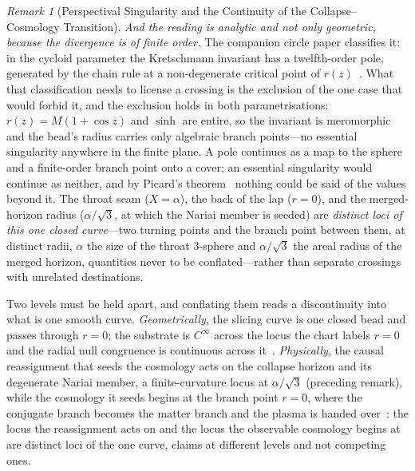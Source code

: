 \documentclass[11pt,a4paper]{article}
\theoremstyle{plain}
\theoremstyle{definition}
\theoremstyle{remark}
\newtheorem{remark}{Remark}
\begin{document}
\begin{remark}[Perspectival Singularity and the Continuity of the Collapse--Cosmology Transition]
\emph{And the reading is analytic and not only geometric, because the divergence is of finite order.} The companion circle paper classifies it: in the cycloid parameter the Kretschmann invariant has a twelfth-order pole, generated by the chain rule at a non-degenerate critical point of $r(z)$~\cite{JanzenCircle}. What that classification needs to license a crossing is the exclusion of the one case that would forbid it, and the exclusion holds in both parametrisations: $r(z)=M(1+\cos z)$ and $\sinh$ are entire, so the invariant is meromorphic and the bead's radius carries only algebraic branch points---no essential singularity anywhere in the finite plane. A pole continues as a map to the sphere and a finite-order branch point onto a cover; an essential singularity would continue as neither, and by Picard's theorem~\cite{Ahlfors1979} nothing could be said of the values beyond it. The throat seam ($X=\alpha$), the back of the lap ($r=0$), and the merged-horizon radius ($\alpha/\sqrt3$, at which the Nariai member is seeded) are \emph{distinct loci of this one closed curve}---two turning points and the branch point between them, at distinct radii, $\alpha$ the size of the throat $3$-sphere and $\alpha/\sqrt3$ the areal radius of the merged horizon, quantities never to be conflated---rather than separate crossings with unrelated destinations.

Two levels must be held apart, and conflating them reads a discontinuity into what is one smooth curve. \emph{Geometrically}, the slicing curve is one closed bead and passes through $r=0$; the substrate is $C^\infty$ across the locus the chart labels $r=0$ and the radial null congruence is continuous across it~\cite{JanzenCircle,JanzenSlicing}. \emph{Physically}, the causal reassignment that seeds the cosmology acts on the collapse horizon and its degenerate Nariai member, a finite-curvature locus at $\alpha/\sqrt3$ (preceding remark), while the cosmology it seeds begins at the branch point $r=0$, where the conjugate branch becomes the matter branch and the plasma is handed over~\cite{JanzenCRcosmology}: the locus the reassignment acts on and the locus the observable cosmology begins at are distinct loci of the one curve, claims at different levels and not competing ones.
\end{remark}
\end{document}
